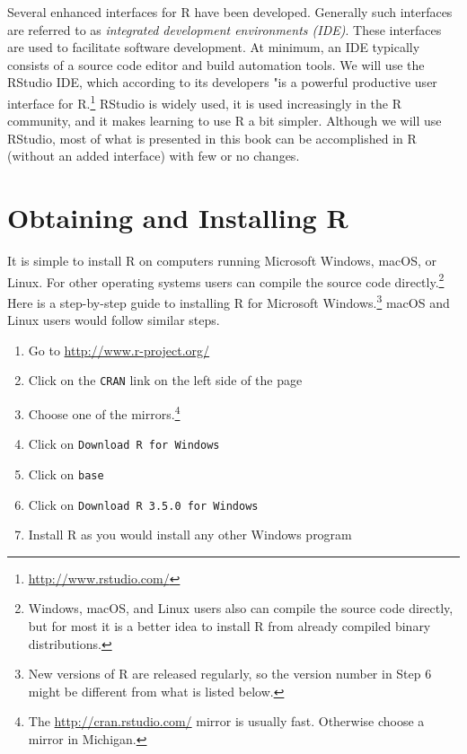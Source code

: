 \documentclass[]{krantz}
\providecommand{\tightlist}{%
  \setlength{\itemsep}{0pt}\setlength{\parskip}{0pt}}
\begin{document}
Several enhanced interfaces for R have been developed. Generally such interfaces are referred to as \emph{integrated development environments (IDE)}. These interfaces are used to facilitate software development. At minimum, an IDE typically consists of a source code editor and build automation tools. We will use the RStudio IDE, which according to its developers "is a powerful productive user interface for R.\footnote{\url{http://www.rstudio.com/}}
RStudio is widely used, it is used increasingly in the R community, and it makes learning to use R a bit simpler. Although we will use RStudio, most of what is presented in this book can be accomplished in R (without an added interface) with few or no changes.

\hypertarget{obtaining-and-installing-r}{%
\section{Obtaining and Installing R}\label{obtaining-and-installing-r}}

It is simple to install R on computers running Microsoft Windows, macOS, or Linux. For other operating systems users can compile the source code directly.\footnote{Windows, macOS, and Linux users also can compile the source code directly, but for most it is a better idea to install R from already compiled binary distributions.}
Here is a step-by-step guide to installing R for Microsoft Windows.\footnote{New versions of R are released regularly, so the version number in Step 6 might be different from what is listed below.} macOS and Linux users would follow similar steps.

\begin{enumerate}
\def\labelenumi{\arabic{enumi}.}
\tightlist
\item
  Go to \url{http://www.r-project.org/}
\item
  Click on the \texttt{CRAN} link on the left side of the page
\item
  Choose one of the mirrors.\footnote{The \url{http://cran.rstudio.com/} mirror is usually fast. Otherwise choose a mirror in Michigan.}
\item
  Click on \texttt{Download\ R\ for\ Windows}
\item
  Click on \texttt{base}
\item
  Click on \texttt{Download\ R\ 3.5.0\ for\ Windows}
\item
  Install R as you would install any other Windows program
\end{enumerate}
\end{document}
